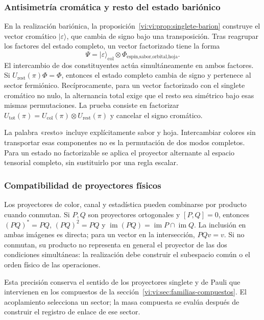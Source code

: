 \subsubsection{Antisimetría cromática y resto del estado bariónico}

En la realización bariónica, la
proposición~\ref{vi:vi:prop:singlete-barion} construye el vector
cromático \(|\varepsilon\rangle\), que cambia de signo
bajo una transposición. Tras reagrupar los factores del estado
completo, un vector factorizado tiene la forma
\[
 \Psi=|\varepsilon\rangle_{\mathrm{col}}
 \otimes\Phi_{\text{espín,sabor,orbital,hoja}}.
\]
El intercambio de dos constituyentes actúa simultáneamente
en ambos factores. Si \(U_{\mathrm{rest}}(\pi)\Phi=\Phi\),
entonces el estado completo cambia de signo y pertenece al
sector fermiónico. Recíprocamente, para un vector factorizado
con el singlete cromático no nulo, la alternancia total exige
que el resto sea simétrico bajo esas mismas permutaciones.
La prueba consiste en factorizar
\(U_{\mathrm{tot}}(\pi)=U_{\mathrm{col}}(\pi)\otimes
U_{\mathrm{rest}}(\pi)\) y cancelar el signo cromático.

La palabra «resto» incluye explícitamente sabor y hoja.
Intercambiar colores sin transportar esas componentes no es
la permutación de dos modos completos. Para un estado no
factorizable se aplica el proyector alternante al espacio
tensorial completo, sin sustituirlo por una regla escalar.

\subsubsection{Compatibilidad de proyectores físicos}

Los proyectores de color, canal y estadística pueden combinarse
por producto cuando conmutan. Si \(P,Q\) son proyectores
ortogonales y \([P,Q]=0\), entonces
\((PQ)^*=PQ\), \((PQ)^2=PQ\) y
\(\operatorname{im}(PQ)=\operatorname{im}P\cap\operatorname{im}Q\).
La inclusión en ambas imágenes es directa; para un vector
en la intersección, \(PQv=v\). Si no conmutan, su producto
no representa en general el proyector de las dos condiciones
simultáneas: la realización debe construir el subespacio
común o el orden físico de las operaciones.

Esta precisión conserva el sentido de los proyectores
singlete y de Pauli que intervienen en los compuestos de la
sección~\ref{vi:vi:sec:familias-compuestos}. El acoplamiento
selecciona un sector; la masa compuesta se evalúa después
de construir el registro de enlace de ese sector.


